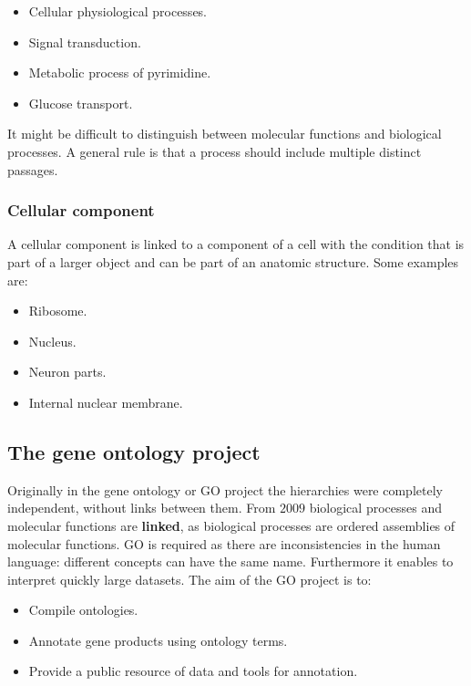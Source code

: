 		\begin{multicols}{4}
			\begin{itemize}
				\item Cellular physiological processes.
				\item Signal transduction.
				\item Metabolic process of pyrimidine.
				\item Glucose transport.
			\end{itemize}
		\end{multicols}

		It might be difficult to distinguish between molecular functions and biological processes.
		A general rule is that a process should include multiple distinct passages.

		\subsubsection{Cellular component}
		A cellular component is linked to a component of a cell with the condition that is part of a larger object and can be part of an anatomic structure.
		Some examples are:

		\begin{multicols}{4}
			\begin{itemize}
				\item Ribosome.
				\item Nucleus.
				\item Neuron parts.
				\item Internal nuclear membrane.
			\end{itemize}
		\end{multicols}


		\subsection{The gene ontology project}
		Originally in the gene ontology or GO project the hierarchies were completely independent, without links between them.
		From $2009$ biological processes and molecular functions are \textbf{linked}, as biological processes are ordered assemblies of molecular functions.
		GO is required as there are inconsistencies in the human language: different concepts can have the same name.
		Furthermore it enables to interpret quickly large datasets.
		The aim of the GO project is to:

		\begin{multicols}{3}
			\begin{itemize}
				\item Compile ontologies.
				\item Annotate gene products using ontology terms.
				\item Provide a public resource of data and tools for annotation.
			\end{itemize}
		\end{multicols}

